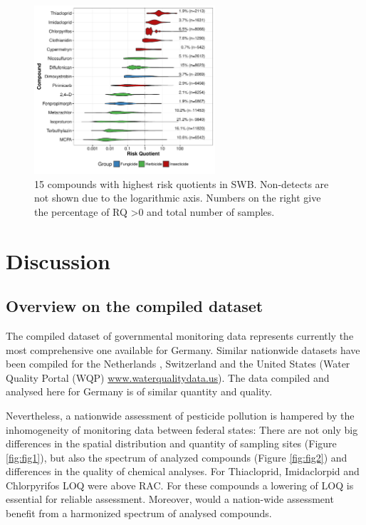 \documentclass[journal=esthag,manuscript=article]{achemso}
\begin{document}
\begin{figure}[ht]
  \includegraphics[width=0.6\textwidth]{figure6.pdf}
  \caption{15 compounds with highest risk quotients in SWB. Non-detects are not shown due to the logarithmic axis. Numbers on the right give the percentage of RQ \textgreater 0 and total number of samples.
  }
  \label{fig:fig6}
\end{figure}




\section{Discussion}
\subsection{Overview on the compiled dataset}
The compiled dataset of governmental monitoring data represents currently the most comprehensive one available for Germany.
Similar nationwide datasets have been compiled for the Netherlands \citep{vijver_spatial_2008}, Switzerland \citep{munz_pestizidmessungen_2011} and the United States (Water Quality Portal (WQP) \url{www.waterqualitydata.us}).
The data compiled and analysed here for Germany is of similar quantity and quality.

Nevertheless, a nationwide assessment of pesticide pollution is hampered by the inhomogeneity of monitoring data between federal states:
There are not only big differences in the spatial distribution and quantity of sampling sites (Figure \ref{fig:fig1}), but also the spectrum of analyzed compounds (Figure \ref{fig:fig2}) and differences in the quality of chemical analyses. 
For Thiacloprid, Imidaclorpid and Chlorpyrifos LOQ were above RAC.
For these compounds a lowering of LOQ is essential for reliable assessment.
Moreover, would a nation-wide assessment benefit from a harmonized spectrum of analysed compounds.
\end{document}
